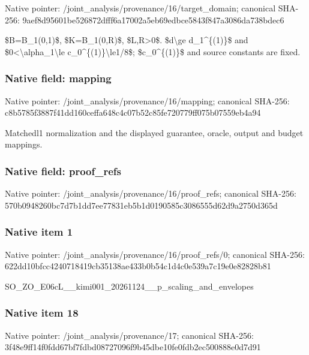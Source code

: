 \documentclass[10pt,a4paper]{article}
\begin{document}
Native pointer: /joint\_analysis/provenan\allowbreak{}ce/16/target\_domain; canonical SHA-256: 9aef8d95601be526872dfff6\allowbreak{}a17002a5eb69edbce5843f84\allowbreak{}7a3086da738bdec6


\$B=B\_1(0,1)\$, \$K=B\_1(0,R)\$, \$L,R>0\$. \$d\textbackslash{}ge d\_1\textasciicircum{}\{(1)\}\$ and \$0<\textbackslash{}alpha\_1\textbackslash{}le c\_0\textasciicircum{}\{(1)\}\textbackslash{}le1/8\$; \$c\_0\textasciicircum{}\{(1)\}\$ and source constants are fixed.


\subsubsection{Native field: mapping}


Native pointer: /joint\_analysis/provenance/16/mapping; canonical SHA-256: c8b5785f3887f41dd160ceff\allowbreak{}a648c4c07b52c85fe720779f\allowbreak{}f075b07559eb4a94


Matchedl1 normalization and the displayed guarantee, oracle, output and budget mappings.


\subsubsection{Native field: proof\_refs}


Native pointer: /joint\_analysis/provenan\allowbreak{}ce/16/proof\_refs; canonical SHA-256: 570b0948260bc7d7b1dd7ee7\allowbreak{}7831eb5b1d0190585c308655\allowbreak{}5d62d9a2750d365d



\subsubsection{Native item 1}


Native pointer: /joint\_analysis/provenan\allowbreak{}ce/16/proof\_refs/0; canonical SHA-256: 622dd10bfcc4240718419cb3\allowbreak{}5138ae433b0b54c1d4c0e539\allowbreak{}a7c19e0e82828b81


SO\_ZO\_E06cL\_\_kimi001\_202\allowbreak{}61124\_\_p\_scaling\_and\_env\allowbreak{}elopes


\subsubsection{Native item 18}


Native pointer: /joint\_analysis/provenance/17; canonical SHA-256: 3f48e9ff14f0fdd67bf7fdbd\allowbreak{}08727096f9b45dbe10fe0fdb\allowbreak{}2ec500888e0d7d91
\end{document}
